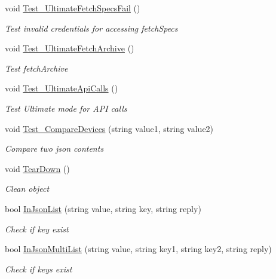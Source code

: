 \begin{DoxyCompactItemize}
void \hyperlink{class_h_d3_test_1_1_h_d3_test_aaf0fcf652edfacd6021bb02833f74eaa}{Test\+\_\+\+Ultimate\+Fetch\+Specs\+Fail} ()
\begin{DoxyCompactList}\small\item\em Test invalid credentials for accessing fetch\+Specs \end{DoxyCompactList}\item 
void \hyperlink{class_h_d3_test_1_1_h_d3_test_a59fefae1b92cbee771b40ebd32d79bae}{Test\+\_\+\+Ultimate\+Fetch\+Archive} ()
\begin{DoxyCompactList}\small\item\em Test fetch\+Archive \end{DoxyCompactList}\item 
void \hyperlink{class_h_d3_test_1_1_h_d3_test_aa1651e05529fdd62c54fcd22e1ceaf9d}{Test\+\_\+\+Ultimate\+Api\+Calls} ()
\begin{DoxyCompactList}\small\item\em Test Ultimate mode for A\+P\+I calls \end{DoxyCompactList}\item 
void \hyperlink{class_h_d3_test_1_1_h_d3_test_ac41105eb9883a3c16d366266aaa8c12d}{Test\+\_\+\+Compare\+Devices} (string value1, string value2)
\begin{DoxyCompactList}\small\item\em Compare two json contents \end{DoxyCompactList}\item 
void \hyperlink{class_h_d3_test_1_1_h_d3_test_a4d198915e0f68c33662521243d8d71ea}{Tear\+Down} ()
\begin{DoxyCompactList}\small\item\em Clean object \end{DoxyCompactList}\item 
bool \hyperlink{class_h_d3_test_1_1_h_d3_test_a8d5a78445560881427c5bf26fe6609c8}{In\+Json\+List} (string value, string key, string reply)
\begin{DoxyCompactList}\small\item\em Check if key exist \end{DoxyCompactList}\item 
bool \hyperlink{class_h_d3_test_1_1_h_d3_test_abafa6c57084f91645473349bf78adf0c}{In\+Json\+Multi\+List} (string value, string key1, string key2, string reply)
\begin{DoxyCompactList}\small\item\em Check if keys exist \end{DoxyCompactList}\end{DoxyCompactItemize}
